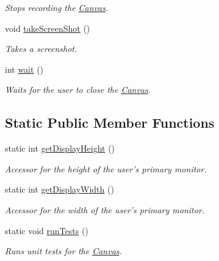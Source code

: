 \begin{DoxyCompactItemize}
\begin{DoxyCompactList}\small\item\em \-Stops recording the \hyperlink{classtsgl_1_1_canvas}{\-Canvas}. \end{DoxyCompactList}\item 
void \hyperlink{classtsgl_1_1_canvas_ac035f43763b198f6915a0772973a5ea9}{take\-Screen\-Shot} ()
\begin{DoxyCompactList}\small\item\em \-Takes a screenshot. \end{DoxyCompactList}\item 
int \hyperlink{classtsgl_1_1_canvas_a39e69fd4d1ad8cf0e22ecea12f1ddf08}{wait} ()
\begin{DoxyCompactList}\small\item\em \-Waits for the user to close the \hyperlink{classtsgl_1_1_canvas}{\-Canvas}. \end{DoxyCompactList}\end{DoxyCompactItemize}
\subsection*{\-Static \-Public \-Member \-Functions}
\begin{DoxyCompactItemize}
\item 
static int \hyperlink{classtsgl_1_1_canvas_a664b101f972845eaf5fdc4d9e664e623}{get\-Display\-Height} ()
\begin{DoxyCompactList}\small\item\em \-Accessor for the height of the user's primary monitor. \end{DoxyCompactList}\item 
static int \hyperlink{classtsgl_1_1_canvas_abbe5c392cac2320fecf1f2751afb207c}{get\-Display\-Width} ()
\begin{DoxyCompactList}\small\item\em \-Accessor for the width of the user's primary monitor. \end{DoxyCompactList}\item 
\hypertarget{classtsgl_1_1_canvas_a3365d92635f650cca2eda69812bef60b}{static void \hyperlink{classtsgl_1_1_canvas_a3365d92635f650cca2eda69812bef60b}{run\-Tests} ()}\label{classtsgl_1_1_canvas_a3365d92635f650cca2eda69812bef60b}

\begin{DoxyCompactList}\small\item\em \-Runs unit tests for the \hyperlink{classtsgl_1_1_canvas}{\-Canvas}. \end{DoxyCompactList}\end{DoxyCompactItemize}

